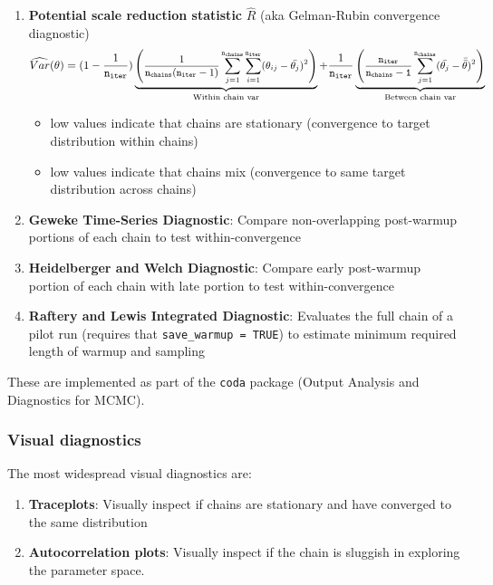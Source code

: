\documentclass[
  11pt,
]{article}
\providecommand{\tightlist}{%
  \setlength{\itemsep}{0pt}\setlength{\parskip}{0pt}}
\begin{document}
\begin{enumerate}
\def\labelenumi{\arabic{enumi}.}
\tightlist
\item
  \textbf{Potential scale reduction statistic} \(\hat{R}\) (aka Gelman-Rubin convergence diagnostic)
  \[\small \widehat{Var}(\theta) = (1 - \frac{1}{\mathtt{n_{iter}}})
   \underbrace{\Bigg(\frac{1}{ \mathtt{n_{chains}} (\mathtt{n_{iter}} - 1)} \sum_{j=1}^{\mathtt{n_{chains}}} \sum_{i=1}^{\mathtt{n_{iter}}} (\theta_{ij} - \bar{\theta_j})^2 \Bigg)}_{\text{Within chain var}} + 
   \frac{1}{\mathtt{n_{iter}}}  \underbrace{\Bigg(\frac{\mathtt{n_{iter}}}{\mathtt{n_{chains} - 1}} \sum_{j=1}^{\mathtt{n_{chains}}} (\bar{\theta_j} - \bar{\bar{\theta}})^2\Bigg)}_{\text{Between chain var}}\]

  \begin{itemize}
  \tightlist
  \item
    low values indicate that chains are stationary (convergence to target distribution within chains)
  \item
    low values indicate that chains mix (convergence to same target distribution across chains)
  \end{itemize}
\item
  \textbf{Geweke Time-Series Diagnostic}: Compare non-overlapping post-warmup portions of each chain to test within-convergence
\item
  \textbf{Heidelberger and Welch Diagnostic}: Compare early post-warmup portion of each chain with late portion to test within-convergence
\item
  \textbf{Raftery and Lewis Integrated Diagnostic}: Evaluates the full chain of a pilot run (requires that \texttt{save\_warmup\ =\ TRUE}) to estimate minimum required length of warmup and sampling
\end{enumerate}

These are implemented as part of the \texttt{coda} package (Output Analysis and Diagnostics for MCMC).

\hypertarget{visual-diagnostics}{%
\subsubsection{Visual diagnostics}\label{visual-diagnostics}}

The most widespread visual diagnostics are:

\begin{enumerate}
\def\labelenumi{\arabic{enumi}.}
\tightlist
\item
  \textbf{Traceplots}: Visually inspect if chains are stationary and have converged to the same distribution
\item
  \textbf{Autocorrelation plots}: Visually inspect if the chain is sluggish in exploring the parameter space.
\end{enumerate}
\end{document}
